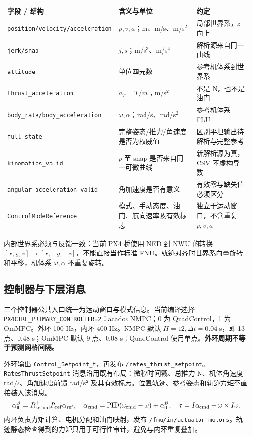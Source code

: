 \documentclass[UTF8,fontset=fandol,a4paper,10pt]{ctexart}
\newcommand{\code}[1]{{\small\nolinkurl{#1}}}
\begin{document}
\par\noindent\begin{tabularx}{\linewidth}{@{}p{44mm}YY@{}}\toprule
字段 / 结构 & 含义与单位 & 约定\\\midrule
\code{position/velocity/acceleration} & $p,v,a$；m、m/s、m/s$^2$ & 局部世界系，$z$ 向上\\
\code{jerk/snap} & $j,s$；m/s$^3$、m/s$^4$ & 解析源来自同一曲线\\
\code{attitude} & 单位四元数 & 参考机体系到世界系\\
\code{thrust_acceleration} & $a_T=T/m$；m/s$^2$ & 不是 N，也不是油门\\
\code{body_rate/body_acceleration} & $\omega,\alpha$；rad/s、rad/s$^2$ & 参考机体系 FLU\\
\code{full_state} & 完整姿态/推力/角速度是否为权威值 & 区别平坦输出待解析与完整参考\\
\code{kinematics_valid} & $p$ 至 snap 是否来自同一可微曲线 & 新解析源为真，CSV 不虚构导数\\
\code{angular_acceleration_valid} & 角加速度是否有意义 & 有效零与缺失值必须区分\\
\code{ControlModeReference} & 模式、手动态度、油门、航向速率及有效标志 & 独立于运动窗口，不含重复 $p,v,a$\\\bottomrule
\end{tabularx}\par
内部世界系必须与反馈一致：当前 PX4 桥使用 NED 到 NWU 的转换 $[x,y,z]\mapsto[x,-y,-z]$，不能直接当作标准 ENU。轨迹对齐时世界系向量旋转和平移，机体系 $\omega,\alpha$ 不重复旋转。

\subsection{控制器与下层消息}
三个控制器公共入口统一为运动窗口与模式信息。当前编译选择 \code{PX4CTRL_PRIMARY_CONTROLLER=2}：acados NMPC；0 为 QuadControl，1 为 OmMPC。外环 100 Hz，内环 400 Hz。NMPC 默认 $H=12,\Delta t=0.04$ s，即 13 点、0.48 s；OmMPC 默认 9 点、0.08 s；QuadControl 使用单点。\textbf{外环周期不等于预测网格间隔。}

外环输出 \code{Control_Setpoint_t}，再发布 \code{/rates_thrust_setpoint}。\code{RatesThrustSetpoint} 消息沿用既有布局：微秒时间戳、总推力 N、机体角速度 rad/s、角加速度前馈 rad/s$^2$ 及其有效标志。位置轨迹、参考姿态和轨迹力矩不直接装入该消息。
\[
 \alpha_{\rm ff}^{B}=R_{\rm actual}^{\top}R_{\rm ref}\alpha_{\rm ref},\quad
 \alpha_{\rm cmd}=\mathrm{PID}(\omega_{\rm cmd}-\omega)+\alpha_{\rm ff}^{B},\quad
 \tau=I\alpha_{\rm cmd}+\omega\times I\omega.
\]
内环负责力矩计算、电机分配和油门映射，发布 \code{/fmu/in/actuator_motors}。轨迹静态检查得到的力矩只用于可行性审计，避免与内环重复叠加。
\end{document}
